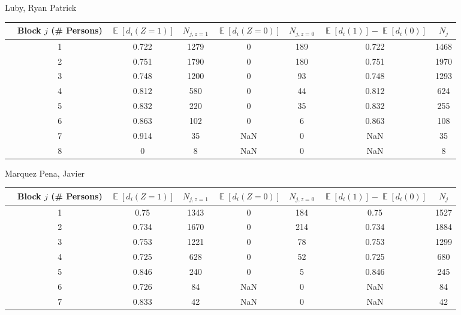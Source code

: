 \documentclass[11pt,notitlepage]{article}
\def\E{\mathop{\mathbb{E}}}
\begin{document}
\clearpage

Luby, Ryan Patrick
\begin{table}[h!]\small
\begin{center}
\begin{tabular}{rc|cc|cc|cc}
  \hline
 & Block $j$ (\# Persons) & $\E[d_i(Z=1)]$ & $N_{j, z=1}$ & $\E[d_i(Z=0)]$ & $N_{j, z=0}$ & $\E[d_i(1)]-\E[d_i(0)]$ & $N_j$ \\ 
  \hline
& 1 & 0.722 & 1279 & 0 & 189 & 0.722 & 1468 \\ 
& 2 & 0.751 & 1790 & 0 & 180 & 0.751 & 1970 \\ 
& 3 & 0.748 & 1200 & 0 & 93 & 0.748 & 1293 \\ 
& 4 & 0.812 & 580 & 0 & 44 & 0.812 & 624 \\ 
& 5 & 0.832 & 220 & 0 & 35 & 0.832 & 255 \\ 
& 6 & 0.863 & 102 & 0 & 6 & 0.863 & 108 \\ 
& 7 & 0.914 & 35 & NaN & 0 & NaN & 35 \\ 
& 8 & 0 & 8 & NaN & 0 & NaN & 8 \\ 
   \hline
\end{tabular}
\end{center}
\end{table}


Marquez Pena, Javier
\begin{table}[h!]\small
\begin{center}
\begin{tabular}{rc|cc|cc|cc}
  \hline
 & Block $j$ (\# Persons) & $\E[d_i(Z=1)]$ & $N_{j, z=1}$ & $\E[d_i(Z=0)]$ & $N_{j, z=0}$ & $\E[d_i(1)]-\E[d_i(0)]$ & $N_j$ \\ 
  \hline
 & 1 & 0.75 & 1343 & 0 & 184 & 0.75 & 1527 \\ 
 & 2 & 0.734 & 1670 & 0 & 214 & 0.734 & 1884 \\ 
 & 3 & 0.753 & 1221 & 0 & 78 & 0.753 & 1299 \\ 
 & 4 & 0.725 & 628 & 0 & 52 & 0.725 & 680 \\ 
 & 5 & 0.846 & 240 & 0 & 5 & 0.846 & 245 \\ 
 & 6 & 0.726 & 84 & NaN & 0 & NaN & 84 \\ 
 & 7 & 0.833 & 42 & NaN & 0 & NaN & 42 \\ 
   \hline
\end{tabular}
\end{center}
\end{table}
\end{document}
